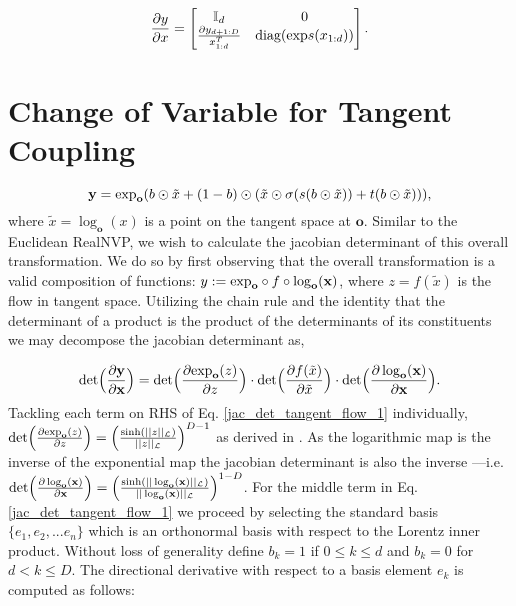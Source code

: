 \begin{equation} 
    \frac{\partial y}{\partial x} = \begin{bmatrix}
                                    \mathbb{I}_{d} & 0 \\
                                
                                   \frac{\partial y_{d+1:D}}{x^T_{1:d}} & \textnormal{diag}(\textnormal{exp}s(x_{1:d}))
                                    \end{bmatrix}.
\end{equation}

\section{Change of Variable for Tangent Coupling}
\label{tangent_coupling_proof_appendix}
\begin{equation}
    \textbf{y} =  \textnormal{exp}_{\textbf{o}}(b \odot \tilde{x} + (1 - b)\odot(\tilde{x} \odot \sigma(s(b \odot \tilde{x})) + t(b \odot \tilde{x}))),
\end{equation}
where $\tilde{x} = \log_{\textbf{o}}(x)$ is a point on the tangent space at $\textbf{o}$. Similar to the Euclidean RealNVP, we wish to calculate the jacobian determinant of this overall transformation. We do so by first observing that the overall transformation is a valid composition of functions: $y := \textnormal{exp}_{\textbf{o}} \circ f\circ \log_{\textbf{o}}(\textbf{x})$, where $z = f(\tilde{x})$ is the flow in tangent space. Utilizing the chain rule and the identity that the determinant of a product is the product of the determinants of its constituents we may decompose the jacobian determinant as,

\begin{equation}
    \textnormal{det}\Big (\frac{\partial \textbf{y}}{\partial \textbf{x}}\Big) =  \textnormal{det}\Big (\frac{\partial \textnormal{exp}_{\textbf{o}}(z)}{\partial z}\Big) \cdot \textnormal{det}\Big (\frac{\partial f(\tilde{x})}{\partial \tilde{x}}\Big) \cdot  \textnormal{det}\Big (\frac{\partial \log_{\textbf{o}}(\textbf{x})}{\partial \textbf{x}}\Big)
    \label{jac_det_tangent_flow_1}.
\end{equation}
Tackling each term on RHS of Eq. \ref{jac_det_tangent_flow_1} individually, $ \textnormal{det}\Big (\frac{\partial \textnormal{exp}_{\textbf{o}}(z)}{\partial z}\Big) = \Big(\frac{\sinh(||z||_{\mathcal{L}})}{||z||_{\mathcal{L}}}\Big)^{D-1}$ as derived in \cite{nagano2019wrapped}. As the logarithmic map is the inverse of the exponential map the jacobian determinant is also the inverse ---i.e.  $\textnormal{det}\Big (\frac{\partial \log_{\textbf{o}}(\textbf{x})}{\partial \textbf{x}}\Big) = \Big(\frac{\sinh(||\log_{\textbf{o}}(\textbf{x})||_{\mathcal{L}})}{||\log_{\textbf{o}}(\textbf{x})||_{\mathcal{L}}}\Big)^{1-D}$. For the middle term in Eq. \ref{jac_det_tangent_flow_1} we proceed by selecting the standard basis $\{e_1, e_2, ... e_n\}$ which is an orthonormal basis  with respect to the Lorentz inner product. Without loss of generality define $b_k = 1$ if $0 \leq k \leq d$ and $b_k = 0$ for $d < k \leq D$. The directional derivative with respect to a basis element $e_k$ is computed as follows:

